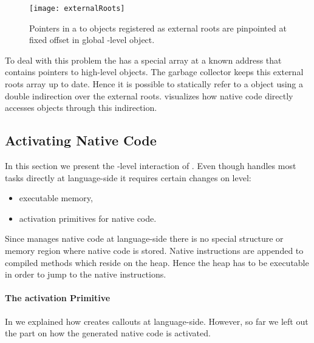 \begin{figure}[h]
	\centering
	\texttt{[image: externalRoots]}
	\caption[\NBFFI External Roots]{Pointers in a  to objects registered as external roots are pinpointed at fixed offset in global \VM-level object.}
\end{figure}

To deal with this problem the \VM has a special array at a known address that contains pointers to high-level objects.
The garbage collector keeps this external roots array up to date.
Hence it is possible to statically refer to a \PH object using a double indirection over the external roots.
 visualizes how native code directly accesses \PH objects through this indirection.


\subsection{Activating Native Code}

In this section we present the \VM-level interaction of \NB.
Even though \NB handles most tasks directly at language-side it requires certain changes on \VM level:
\begin{itemize}
	\item executable memory,
	\item activation primitives for native code.
\end{itemize}
%
Since \NB manages native code at language-side there is no special structure or memory region where native code is stored.
Native instructions are appended to compiled methods which reside on the heap.
Hence the heap has to be executable in order to jump to the native instructions.


\paragraph{The \NB activation Primitive}


In  we explained how \NB creates \FFI callouts at language-side.
However, so far we left out the part on how the generated native code is activated.

